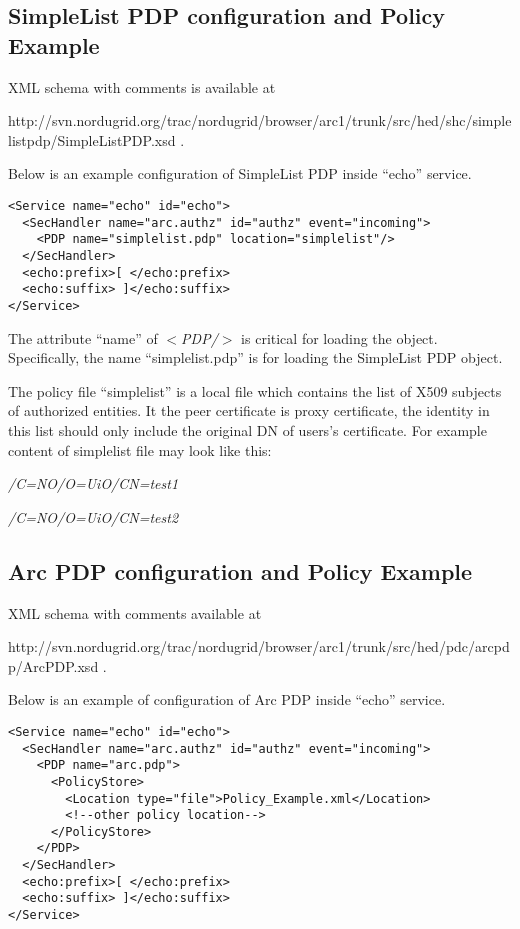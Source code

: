 \documentclass{book}
\begin{document}
\subsection{SimpleList PDP configuration and Policy Example} %
\label{subsec:simplepdp_conf}
XML schema with comments is available at 

http://svn.nordugrid.org/trac/nordugrid/browser/arc1/trunk/src/hed/shc/simplelistpdp/SimpleListPDP.xsd .

Below is an example configuration of SimpleList PDP inside ``echo'' service.

\begin{verbatim}
<Service name="echo" id="echo">
  <SecHandler name="arc.authz" id="authz" event="incoming">
    <PDP name="simplelist.pdp" location="simplelist"/>
  </SecHandler>
  <echo:prefix>[ </echo:prefix>
  <echo:suffix> ]</echo:suffix>
</Service>
\end{verbatim}

The attribute ``name'' of \textit{$<$PDP/$>$} is critical for loading the object. Specifically, the name ``simplelist.pdp'' is for loading the SimpleList PDP object.

The policy file ``simplelist'' is a local file which contains the list of X509 subjects of authorized entities. It the peer certificate is proxy certificate, the identity in this list should only include the original DN of users's certificate.
For example content of simplelist file may look like this:

\emph{/C=NO/O=UiO/CN=test1}

\emph{/C=NO/O=UiO/CN=test2}



\subsection{Arc PDP configuration and Policy Example} %
\label{subsec:arcpdp_conf}
XML schema with comments available at 

http://svn.nordugrid.org/trac/nordugrid/browser/arc1/trunk/src/hed/pdc/arcpdp/ArcPDP.xsd .

Below is an example of configuration of Arc PDP inside ``echo'' service.
\begin{verbatim}
<Service name="echo" id="echo">
  <SecHandler name="arc.authz" id="authz" event="incoming">
    <PDP name="arc.pdp">
      <PolicyStore>
        <Location type="file">Policy_Example.xml</Location>
        <!--other policy location-->
      </PolicyStore>
    </PDP>
  </SecHandler>
  <echo:prefix>[ </echo:prefix>
  <echo:suffix> ]</echo:suffix>
</Service>
\end{verbatim}
\end{document}
